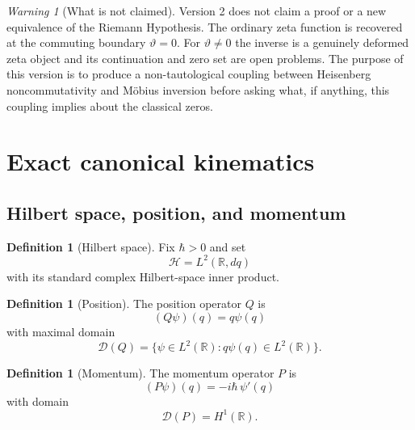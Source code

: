 \documentclass[11pt]{amsart}
\numberwithin{equation}{section}
\theoremstyle{plain}
\theoremstyle{definition}
\newtheorem{definition}[theorem]{Definition}
\theoremstyle{remark}
\newtheorem{warning}[theorem]{Warning}
\newcommand{\R}{\mathbb{R}}
\newcommand{\Hil}{\mathcal{H}}
\newcommand{\Dom}{\mathcal{D}}
\begin{document}
\begin{warning}[What is not claimed]
\label{warn:no_RH_claim}
Version 2 does not claim a proof or a new equivalence of the Riemann
Hypothesis.  The ordinary zeta function is recovered at the commuting boundary
$\vartheta=0$.  For $\vartheta\neq0$ the inverse is a genuinely deformed zeta
object and its continuation and zero set are open problems.  The purpose of
this version is to produce a non-tautological coupling between Heisenberg
noncommutativity and M\"obius inversion before asking what, if anything, this
coupling implies about the classical zeros.
\end{warning}

\section{Exact canonical kinematics}
\label{sec:kinematics}

\subsection{Hilbert space, position, and momentum}
\label{subsec:QP_definitions}

\begin{definition}[Hilbert space]
\label{def:hilbert_space}
Fix $\hbar>0$ and set
\begin{equation}
\Hil=L^2(\R,dq)
\label{eq:hilbert_space}
\end{equation}
with its standard complex Hilbert-space inner product.
\end{definition}

\begin{definition}[Position]
\label{def:position}
The position operator $Q$ is
\begin{equation}
(Q\psi)(q)=q\psi(q)
\label{eq:Q_action}
\end{equation}
with maximal domain
\begin{equation}
\Dom(Q)=\{\psi\in L^2(\R):q\psi(q)\in L^2(\R)\}.
\label{eq:Q_domain}
\end{equation}
\end{definition}

\begin{definition}[Momentum]
\label{def:momentum}
The momentum operator $P$ is
\begin{equation}
(P\psi)(q)=-i\hbar\,\psi'(q)
\label{eq:P_action}
\end{equation}
with domain
\begin{equation}
\Dom(P)=H^1(\R).
\label{eq:P_domain}
\end{equation}
\end{definition}
\end{document}
